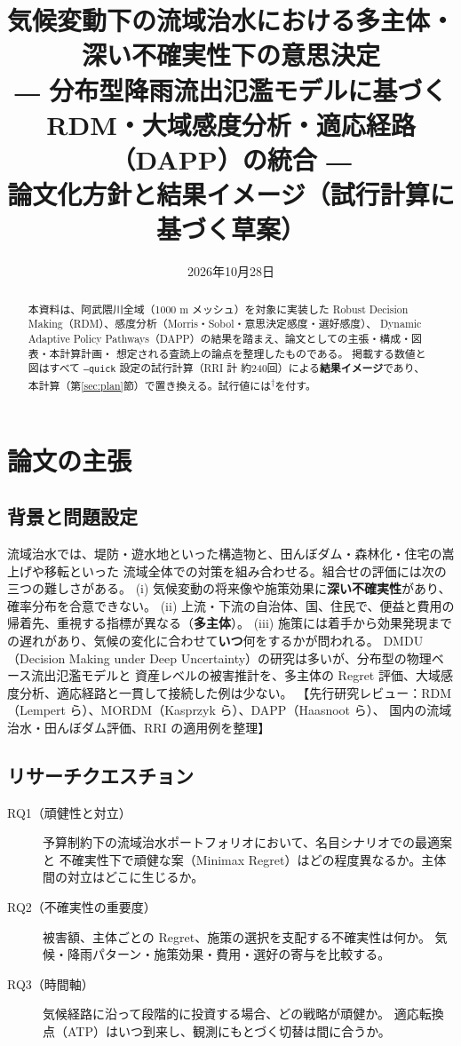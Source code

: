 \documentclass[a4paper,10pt]{ltjsarticle}
\title{気候変動下の流域治水における多主体・深い不確実性下の意思決定\\[2pt]
\large ― 分布型降雨流出氾濫モデルに基づく RDM・大域感度分析・適応経路（DAPP）の統合 ―\\[6pt]
\normalsize 論文化方針と結果イメージ（試行計算に基づく草案）}
\author{}
\date{2026年10月28日}
\newcommand{\todo}[1]{\textcolor{corange}{【#1】}}
\newcommand{\prelim}{\textsuperscript{\textcolor{cgray}{†}}}
\begin{document}
\maketitle

\begin{abstract}
本資料は、阿武隈川全域（1000 m メッシュ）を対象に実装した
Robust Decision Making（RDM）、感度分析（Morris・Sobol・意思決定感度・選好感度）、
Dynamic Adaptive Policy Pathways（DAPP）の結果を踏まえ、論文としての主張・構成・図表・本計算計画・
想定される査読上の論点を整理したものである。
掲載する数値と図はすべて \texttt{--quick} 設定の試行計算（RRI 計 約240回）による\textbf{結果イメージ}であり、
本計算（第\ref{sec:plan}節）で置き換える。試行値には\prelim を付す。
\end{abstract}

\tableofcontents
\bigskip

\section{論文の主張}
\label{sec:claim}

\subsection{背景と問題設定}
流域治水では、堤防・遊水地といった構造物と、田んぼダム・森林化・住宅の嵩上げや移転といった
流域全体での対策を組み合わせる。組合せの評価には次の三つの難しさがある。
(i) 気候変動の将来像や施策効果に\textbf{深い不確実性}があり、確率分布を合意できない。
(ii) 上流・下流の自治体、国、住民で、便益と費用の帰着先、重視する指標が異なる（\textbf{多主体}）。
(iii) 施策には着手から効果発現までの遅れがあり、気候の変化に合わせて\textbf{いつ}何をするかが問われる。
DMDU（Decision Making under Deep Uncertainty）の研究は多いが、分布型の物理ベース流出氾濫モデルと
資産レベルの被害推計を、多主体の Regret 評価、大域感度分析、適応経路と一貫して接続した例は少ない。
\todo{先行研究レビュー：RDM（Lempert ら）、MORDM（Kasprzyk ら）、DAPP（Haasnoot ら）、
国内の流域治水・田んぼダム評価、RRI の適用例を整理}

\subsection{リサーチクエスチョン}
\begin{description}
\item[RQ1（頑健性と対立）] 予算制約下の流域治水ポートフォリオにおいて、名目シナリオでの最適案と
不確実性下で頑健な案（Minimax Regret）はどの程度異なるか。主体間の対立はどこに生じるか。
\item[RQ2（不確実性の重要度）] 被害額、主体ごとの Regret、施策の選択を支配する不確実性は何か。
気候・降雨パターン・施策効果・費用・選好の寄与を比較する。
\item[RQ3（時間軸）] 気候経路に沿って段階的に投資する場合、どの戦略が頑健か。
適応転換点（ATP）はいつ到来し、観測にもとづく切替は間に合うか。
\end{description}
\end{document}
